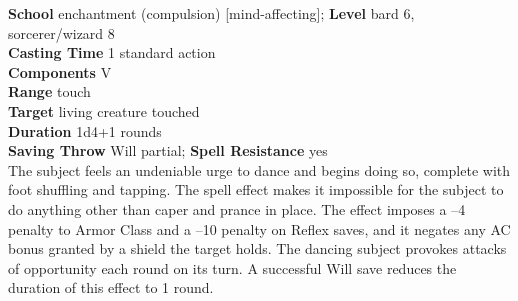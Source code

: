 \textbf{School} enchantment (compulsion) [mind-affecting]; \textbf{Level} bard 6, sorcerer/wizard 8\\
\textbf{Casting Time} 1 standard action\\
\textbf{Components} V\\
\textbf{Range} touch\\
\textbf{Target} living creature touched\\
\textbf{Duration} 1d4+1 rounds\\
\textbf{Saving Throw} Will partial; \textbf{Spell Resistance} yes\\
The subject feels an undeniable urge to dance and begins doing so, complete with foot shuffling and tapping. The spell effect makes it impossible for the subject to do anything other than caper and prance in place. The effect imposes a --4 penalty to Armor Class and a --10 penalty on Reflex saves, and it negates any AC bonus granted by a shield the target holds. The dancing subject provokes attacks of opportunity each round on its turn. A successful Will save reduces the duration of this effect to 1 round.\\
